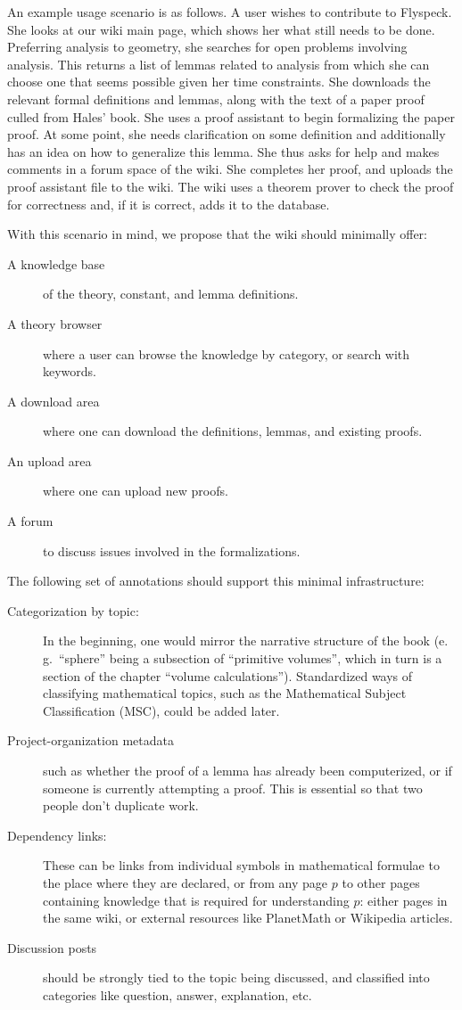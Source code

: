 An example usage scenario is as follows. A user wishes to contribute to
Flyspeck.  She looks at our wiki main page, which shows her what still needs to
be done.  Preferring analysis to geometry, she searches for open problems
involving analysis.  This returns a list of lemmas related to analysis from
which she can choose one that seems possible given her time constraints. She
downloads the relevant formal definitions and lemmas, along with the text of a
paper proof culled from Hales' book.  She uses a proof assistant to begin
formalizing the paper proof.  At some point, she needs
clarification on some definition and additionally has an idea on how to
generalize this lemma.  She thus asks for help and makes comments in a forum
space of the wiki.  She completes her proof, and uploads the proof assistant
file to the wiki.  The wiki uses a theorem prover to check the proof for
correctness and, if it is correct, adds it to the database.

With this scenario in mind, we propose that the wiki should minimally offer: 
\begin{description}
\item[A knowledge base] of the theory, constant, and lemma definitions.
\item[A theory browser] where a user can browse the knowledge by category, or search with keywords.
\item[A download area] where one can download the definitions, lemmas, and existing proofs.
\item[An upload area] where one can upload new proofs.
\item[A forum] to discuss issues involved in the formalizations.
\end{description}

The following set of annotations should support this minimal infrastructure:

\begin{description}
\item[Categorization by topic:] In the beginning, one would mirror the narrative structure
  of the book (e.\,g.\ ``sphere'' being a subsection of ``primitive volumes'', which in turn
  is a section of the chapter ``volume calculations'').  Standardized ways of classifying
  mathematical topics, such as the Mathematical Subject Classification
  (MSC)\cite{AMS:MSC2000}, could be added later.
\item[Project-organization metadata] such as whether the proof
  of a lemma has already been computerized, or if someone is currently 
  attempting a proof.  This is essential so that two people don't duplicate
  work.
\item[Dependency links:] These can be links from individual symbols in
  mathematical formulae to the place where they are declared, or from
  any page $p$ to other pages containing knowledge that is required
  for understanding $p$: either pages in the same wiki, or external
  resources like PlanetMath or Wikipedia articles.
\item[Discussion posts] should be strongly tied to the topic being
  discussed, and classified into categories like question, answer,
  explanation, etc.
\end{description}

